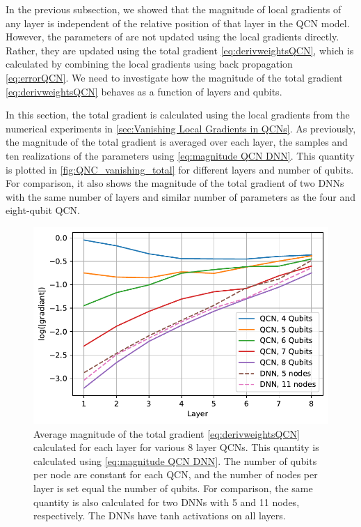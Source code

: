 
In the previous subsection, we showed that the magnitude of local gradients of any layer is independent of the relative position of that layer in the QCN model. However, the parameters of are not updated using the local gradients directly. Rather, they are updated using the total gradient \autoref{eq:derivweightsQCN}, which is calculated by combining the local gradients using back propagation \autoref{eq:errorQCN}. We need to investigate how the magnitude of the total gradient \autoref{eq:derivweightsQCN} behaves as a function of layers and qubits. 

In this section, the total gradient is calculated using the local gradients from the numerical experiments in \autoref{sec:Vanishing Local Gradients in QCNs}. As previously, the magnitude of the total gradient is averaged over each layer, the samples and ten realizations of the parameters using \autoref{eq:magnitude QCN DNN}. This quantity is plotted in \autoref{fig:QNC_vanishing_total} for different layers and number of qubits. For comparison, it also shows the magnitude of the total gradient of two DNNs with the same number of layers and similar number of parameters as the four and eight-qubit QCN.

\begin{figure}[H]
    \centering
    \includegraphics[width=12cm]{latex/figures/vanishing_gradient_total.pdf}
    \caption{Average magnitude of the total gradient \autoref{eq:derivweightsQCN} calculated for each layer for various 8 layer QCNs. This quantity is calculated using \autoref{eq:magnitude QCN DNN}. The number of qubits per node are constant for each QCN, and the number of nodes per layer is set equal the number of qubits.  For comparison, the same quantity is also calculated for two DNNs with 5 and 11 nodes, respectively. The DNNs have tanh activations on all layers.}
    \label{fig:QNC_vanishing_total}
\end{figure}


